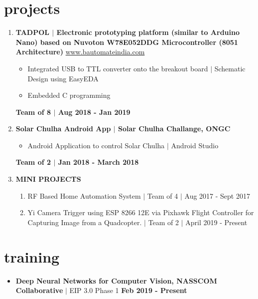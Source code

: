 \documentclass[margin,line]{res}
\begin{document}
\begin{resume}
		\section{\sc projects}
			
			\begin{enumerate}

				\item \textbf{TADPOL $\vert$ Electronic prototyping platform (similar to Arduino Nano) based on Nuvoton W78E052DDG Microcontroller (8051 Architecture) } \newline \url{www.bautomateindia.com} 
					\begin{itemize}
						\item Integrated USB to TTL converter onto the breakout board  $\vert$ Schematic Design using EasyEDA 
						\item Embedded C programming
					\end{itemize}
					\null \hfill \textbf{Team of 8 $\vert$ Aug 2018 - Jan 2019} \newline
				\item \textbf{Solar Chulha Android App  $\vert$  Solar Chulha Challange, ONGC}
					\begin{itemize}	
						\item Android Application to control Solar Chulha  $\vert$  Android Studio
					\end{itemize}
					\null \hfill \textbf{Team of 2 $\vert$ Jan 2018 - March 2018} \newline
				\item \textbf{MINI PROJECTS}
					\begin{enumerate}
						\item RF Based Home Automation System $\vert$ Team of 4 $\vert$ Aug 2017 - Sept 2017
						\item Yi Camera Trigger using ESP 8266 12E via Pixhawk Flight Controller for Capturing Image from a Quadcopter. $\vert$ Team of 2 $\vert$ April 2019 - Present
					\end{enumerate}
			\end{enumerate}

		\section{\sc training}
	
			\begin{itemize}
				\item \textbf{Deep Neural Networks for Computer Vision, NASSCOM Collaborative} $\vert$ EIP 3.0 Phase 1 \newline
				\null \hfill \textbf{Feb 2019 - Present} \newline
			\end{itemize}





\end{resume}
\end{document}
